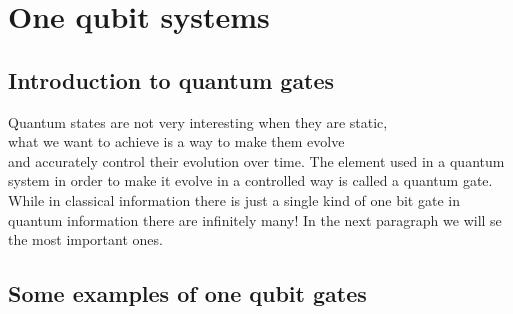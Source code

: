 \documentclass{article}
\begin{document}
\section{One qubit systems}


\subsection{Introduction to quantum gates}
Quantum states are not very interesting when they are static, \\
what we want to achieve is a way to make them evolve\\
and accurately control their evolution over time.
The element used in a quantum system in order to make it evolve
in a controlled way is called a quantum gate.\\
While in classical information there is just a single kind of one bit
gate in quantum information there are infinitely many!
In the next paragraph we will se the most important ones.

\newpage

\subsection{Some examples of one qubit gates}
\end{document}
